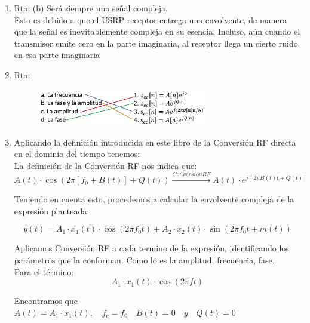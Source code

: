 \begin{enumerate}
\item Rta: (b) Ser\'a siempre una se\~nal compleja.\\
Esto es debido a que el USRP receptor entrega una envolvente, de manera que la señal es inevitablemente compleja en su esencia. Incluso, aún cuando el transmisor emite cero en la parte imaginaria, al receptor llega un cierto ruido en esa parte imaginaria\\
\item Rta:
	\begin{figure} [h!] 
    \centering
    \includegraphics[width=0.7\textwidth]{Imagenes/Comu_1sol.png}
    \end{figure}


\item Aplicando la definición introducida en este libro de la Conversión RF directa en el dominio del tiempo tenemos:
\\

La definición de la Conversión RF nos indica que:
\begin{equation} \label{capdos_dieciseis}
 A(t)\cdot \cos (2\pi[ f_{0}+B(t)]+Q(t))  \overset{Conversion RF}{\rightarrow} A(t)\cdot e^{j[ \cdot 2\pi B(t)t+Q(t)]}
\end{equation}

Teniendo en cuenta esto, procedemos a calcular la envolvente compleja de la expresión planteada: 

\begin{equation} \label{capdos_diecisiete}
y(t)=A_{1}\cdot x_{1}(t)\cdot \cos (2\pi f_{0}t)+ A_{2}\cdot x_{2}(t)\cdot \sin (2\pi f_{0}t+ m(t))
\end{equation}

Aplicamos Conversión RF a cada termino de la expresión, identificando los parámetros que la conforman. Como lo es la amplitud, frecuencia, fase.\\

Para el término: 
\begin{equation} \label{capdos_dieciocho}
A_{1}\cdot x_{1}(t)\cdot \cos (2\pi ft)
\end{equation}

Encontramos que $A(t) = A_{1} \cdot x_{1}(t),\hspace{1em} f_{c}=f_{0} \hspace{1em} B(t)=0 \hspace{1em} y\hspace{1em} Q(t)=0$\\


\end{enumerate}
